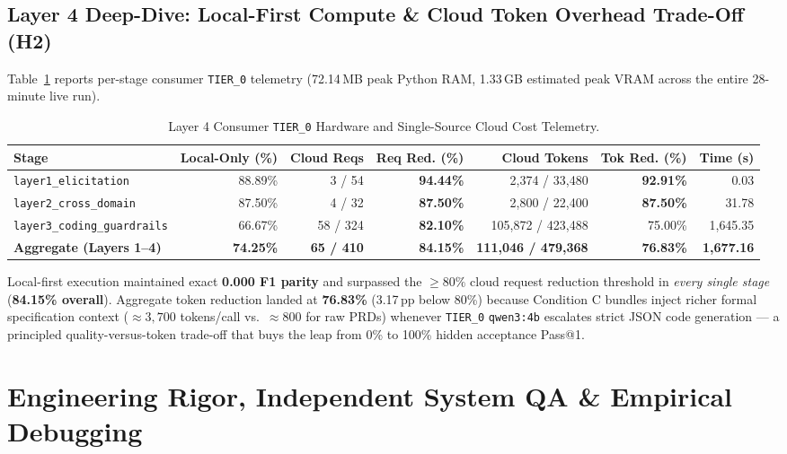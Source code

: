 \documentclass[11pt,a4paper]{article}
\begin{document}
\subsection{Layer 4 Deep-Dive: Local-First Compute & Cloud Token Overhead Trade-Off (H2)}
Table~\ref{tab:l4_telemetry} reports per-stage consumer \texttt{TIER\_0} telemetry (72.14\,MB peak Python RAM, 1.33\,GB estimated peak VRAM across the entire 28-minute live run).

\begin{table}[htbp]
\centering
\caption{Layer 4 Consumer \texttt{TIER\_0} Hardware and Single-Source Cloud Cost Telemetry.}
\label{tab:l4_telemetry}
\small
\begin{tabular}{lrrrrrr}
\toprule
\textbf{Stage} & \textbf{Local-Only (\%)} & \textbf{Cloud Reqs} & \textbf{Req Red. (\%)} & \textbf{Cloud Tokens} & \textbf{Tok Red. (\%)} & \textbf{Time (s)} \\
\midrule
\texttt{layer1\_elicitation} & 88.89\% & 3 / 54 & \textbf{94.44\%} & 2{,}374 / 33{,}480 & \textbf{92.91\%} & 0.03 \\
\texttt{layer2\_cross\_domain} & 87.50\% & 4 / 32 & \textbf{87.50\%} & 2{,}800 / 22{,}400 & \textbf{87.50\%} & 31.78 \\
\texttt{layer3\_coding\_guardrails} & 66.67\% & 58 / 324 & \textbf{82.10\%} & 105{,}872 / 423{,}488 & 75.00\% & 1{,}645.35 \\
\midrule
\textbf{Aggregate (Layers 1--4)} & \textbf{74.25\%} & \textbf{65 / 410} & \textbf{84.15\%} & \textbf{111{,}046 / 479{,}368} & \textbf{76.83\%} & \textbf{1{,}677.16} \\
\bottomrule
\end{tabular}
\end{table}

Local-first execution maintained exact \textbf{0.000 F1 parity} and surpassed the $\ge 80\%$ cloud request reduction threshold in \emph{every single stage} (\textbf{84.15\% overall}). Aggregate token reduction landed at \textbf{76.83\%} (3.17\,pp below 80\%) because Condition C bundles inject richer formal specification context ($\approx 3{,}700$ tokens/call vs.\ $\approx 800$ for raw PRDs) whenever \texttt{TIER\_0} \texttt{qwen3:4b} escalates strict JSON code generation --- a principled quality-versus-token trade-off that buys the leap from 0\% to 100\% hidden acceptance Pass@1.

\section{Engineering Rigor, Independent System QA & Empirical Debugging}
\end{document}
